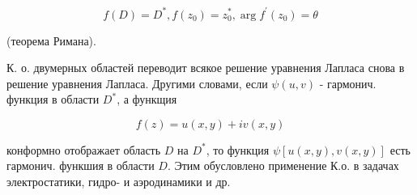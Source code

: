 \documentclass[10pt]{article}
\begin{document}
\[

f(D)=D^{*}, f\left(z_{0}\right)=z_{0}^{*}, \arg f^{\prime}\left(z_{0}\right)=\theta

\]



(теорема Римана).



К. о. двумерных областей переводит всякое решение уравнения Лапласа снова в решение уравнения Лапласа. Другими словами, если $\psi(u, v)$ - гармонич. функция в области $D^{*}$, а функщия



\[

f(z)=u(x, y)+i v(x, y)

\]



конформно отображает область $D$ на $D^{*}$, то функция $\psi[u(x, y), v(x, y)]$ есть гармонич. функшия в области $D$. Этим обусловлено применение К.о. в задачах электростатики, гидро- и аэродинамики и др.
\end{document}
